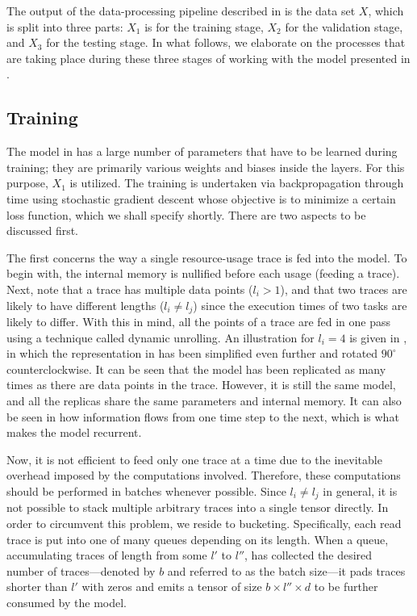The output of the data-processing pipeline described in  is the data
set $X$, which is split into three parts: $X_1$ is for the training stage, $X_2$
for the validation stage, and $X_3$ for the testing stage. In what follows, we
elaborate on the processes that are taking place during these three stages of
working with the model presented in .

\subsection{Training} 
The model in  has a large number of parameters that have to be
learned during training; they are primarily various weights and biases inside
the layers. For this purpose, $X_1$ is utilized. The training is undertaken via
backpropagation through time using stochastic gradient descent
\cite{goodfellow2016} whose objective is to minimize a certain loss function,
which we shall specify shortly. There are two aspects to be discussed first.


The first concerns the way a single resource-usage trace is fed into the model.
To begin with, the internal memory is nullified before each usage (feeding a
trace). Next, note that a trace has multiple data points ($l_i > 1$), and that
two traces are likely to have different lengths ($l_i \neq l_j$) since the
execution times of two tasks are likely to differ. With this in mind, all the
points of a trace are fed in one pass using a technique called dynamic
unrolling. An illustration for $l_i = 4$ is given in , in which the
representation in  has been simplified even further and rotated
$90^\circ$ counterclockwise. It can be seen that the model has been replicated
as many times as there are data points in the trace. However, it is still the
same model, and all the replicas share the same parameters and internal memory.
It can also be seen in  how information flows from one time step to
the next, which is what makes the model recurrent.

Now, it is not efficient to feed only one trace at a time due to the inevitable
overhead imposed by the computations involved. Therefore, these computations
should be performed in batches whenever possible. Since $l_i \neq l_j$ in
general, it is not possible to stack multiple arbitrary traces into a single
tensor directly. In order to circumvent this problem, we reside to bucketing.
Specifically, each read trace is put into one of many queues depending on its
length. When a queue, accumulating traces of length from some $l'$ to $l''$, has
collected the desired number of traces---denoted by $b$ and referred to as the
batch size---it pads traces shorter than $l'$ with zeros and emits a tensor of
size $b \times l'' \times d$ to be further consumed by the model.

